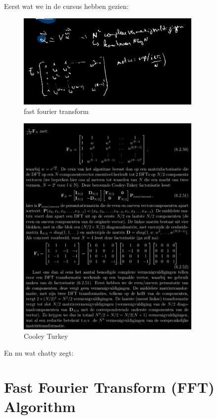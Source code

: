 \documentclass[a4paper]{report}
\begin{document}
Eerst wat we in de cursus hebben gezien:

\begin{figure}[H]
	\centering
	\includegraphics[width=0.8\textwidth]{assets/ffty.png}
	\caption{fast fourier transform}
	\label{fig:ffty}
\end{figure}

\begin{figure}[H]
	\centering
	\includegraphics[width=0.8\textwidth]{assets/cooley_turkey.png}
	\caption{Cooley Turkey}
	\label{fig:cooley_turkey}
\end{figure}

En nu wat chatty zegt:

\section*{Fast Fourier Transform (FFT) Algorithm}
\end{document}

